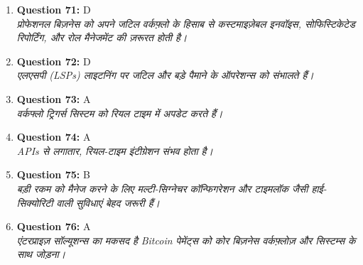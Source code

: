 \documentclass[12pt,a4paper]{article}
\begin{document}
\begin{enumerate}
\item \textbf{Question 71:} D
\\ \textit{प्रोफेशनल बिज़नेस को अपने जटिल वर्कफ़्लो के हिसाब से कस्टमाइज़ेबल इनवॉइस, सोफिस्टिकेटेड रिपोर्टिंग, और रोल मैनेजमेंट की ज़रूरत होती है।}

\item \textbf{Question 72:} D
\\ \textit{एलएसपी (LSPs) लाइटनिंग पर जटिल और बड़े पैमाने के ऑपरेशन्स को संभालते हैं।}

\item \textbf{Question 73:} A
\\ \textit{वर्कफ्लो ट्रिगर्स सिस्टम को रियल टाइम में अपडेट करते हैं।}

\item \textbf{Question 74:} A
\\ \textit{APIs से लगातार, रियल-टाइम इंटीग्रेशन संभव होता है।}

\item \textbf{Question 75:} B
\\ \textit{बड़ी रकम को मैनेज करने के लिए मल्टी-सिग्नेचर कॉन्फिगरेशन और टाइमलॉक जैसी हाई-सिक्योरिटी वाली सुविधाएं बेहद जरूरी हैं।}

\item \textbf{Question 76:} A
\\ \textit{एंटरप्राइज़ सॉल्यूशन्स का मकसद है Bitcoin पेमेंट्स को कोर बिज़नेस वर्कफ़्लोज़ और सिस्टम्स के साथ जोड़ना।}


\end{enumerate}
\end{document}
